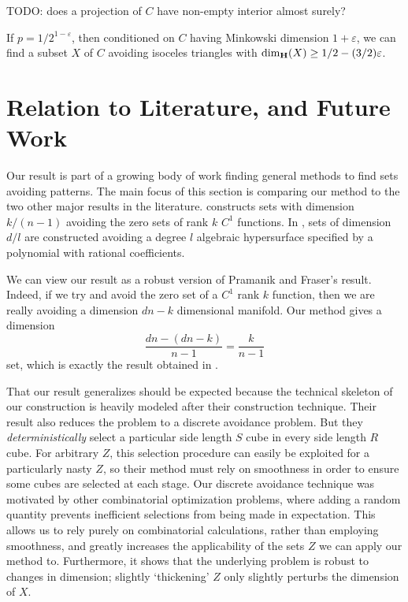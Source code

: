 TODO: does a projection of $C$ have non-empty interior almost surely?

\begin{corollary}
	If $p = 1/2^{1 - \varepsilon}$, then conditioned on $C$ having Minkowski dimension $1 + \varepsilon$, we can find a subset $X$ of $C$ avoiding isoceles triangles with $\operatorname{\dim_{\mathbf{H}}}(X) \geq 1/2 - (3/2) \varepsilon$.
\end{corollary}










\section{Relation to Literature, and Future Work}\label{futureWorkSection}

Our result is part of a growing body of work finding general methods to find sets avoiding patterns. The main focus of this section is comparing our method to the two other major results in the literature. \cite{MalabikaRob} constructs sets with dimension $k/(n-1)$ avoiding the zero sets of rank $k$ $C^1$ functions. In \cite{Mathe}, sets of dimension $d/l$ are constructed avoiding a degree $l$ algebraic hypersurface specified by a polynomial with rational coefficients.

We can view our result as a robust version of Pramanik and Fraser's result. Indeed, if we try and avoid the zero set of a $C^1$ rank $k$ function, then we are really avoiding a dimension $dn - k$ dimensional manifold. Our method gives a dimension
%
\[ \frac{dn - (dn - k)}{n - 1} = \frac{k}{n - 1} \]
%
set, which is exactly the result obtained in \cite{MalabikaRob}.

That our result generalizes \cite{MalabikaRob} should be expected because the technical skeleton of our construction is heavily modeled after their construction technique. Their result also reduces the problem to a discrete avoidance problem. But they {\it deterministically} select a particular side length $S$ cube in every side length $R$ cube. For arbitrary $Z$, this selection procedure can easily be exploited for a particularly nasty $Z$, so their method must rely on smoothness in order to ensure some cubes are selected at each stage. Our discrete avoidance technique was motivated by other combinatorial optimization problems, where adding a random quantity prevents inefficient selections from being made in expectation. This allows us to rely purely on combinatorial calculations, rather than employing smoothness, and greatly increases the applicability of the sets $Z$ we can apply our method to. Furthermore, it shows that the underlying problem is robust to changes in dimension; slightly `thickening' $Z$ only slightly perturbs the dimension of $X$.

